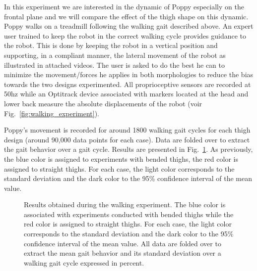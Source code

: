 In this experiment we are interested in the dynamic of Poppy especially on the frontal plane and we will compare the effect of the thigh shape on this dynamic. Poppy walks on a treadmill following the walking gait described above. An expert user trained to keep the robot in the correct walking cycle provides guidance to the robot. This is done by keeping the robot in a vertical position and supporting, in a compliant manner, the lateral movement of the robot as illustrated in attached videos. The user is asked to do the best he can to minimize the movement/forces he applies in both morphologies to reduce the bias towards the two designs experimented. All proprioceptive sensors are recorded at 50hz while an Optitrack device associated  with markers located at the head and lower back measure the absolute displacements of the robot (voir Fig.~\ref{fig:walking_experiment}).



Poppy’s movement is recorded for around 1800 walking gait cycles for each thigh design (around 90,000 data points for each case). Data are folded over to extract the gait behavior over a gait cycle. Results are presented in Fig.~\ref{fig:walk_result}. As previously, the blue color is assigned to experiments with bended thighs, the red color is assigned to straight thighs. For each case, the light color corresponds to the standard deviation and the dark color to the 95\% confidence interval of the mean value.

\begin{figure}[p]
    \hfil
    \hfil
    \hfil
    \hfil
    \hfil
    \caption{Results obtained during the walking experiment.
    The blue color is associated with experiments conducted with bended thighs while the red color is assigned to straight thighs.
    For each case, the light color corresponds to the standard deviation and the dark color to the 95\% confidence interval of the mean value.
    All data are folded over to extract the mean gait behavior and its standard deviation over a walking gait cycle expressed in percent.}
    \label{fig:walk_result}
\end{figure}

